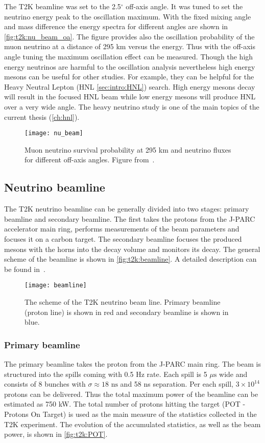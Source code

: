 \documentclass[../main.tex]{subfiles}
\begin{document}
The T2K beamline was set to the 2.5${}^\circ$ off-axis angle. It was tuned to set the neutrino energy peak to the oscillation maximum. With the fixed mixing angle and mass difference the energy spectra for different angles are shown in \autoref{fig:t2k:nu_beam_oa}. The figure provides also the oscillation probability of the muon neutrino at a distance of 295 km versus the energy. Thus with the off-axis angle tuning the maximum oscillation effect can be measured. Though the high energy neutrinos are harmful to the oscillation analysis nevertheless high energy mesons can be useful for other studies. For example, they can be helpful for the Heavy Neutral Lepton (HNL \autoref{sec:intro:HNL}) search. High energy mesons decay will result in the focused HNL beam while low energy mesons will produce HNL over a very wide angle. The heavy neutrino study is one of the main topics of the current thesis (\autoref{ch:hnl}).

\begin{figure}[!ht]
  \centering
  \texttt{[image: nu\_beam]}
  \caption{Muon neutrino survival probability at 295 km and neutrino fluxes for different off-axis angles. Figure from~\cite{Abe2013}.}
  \label{fig:t2k:nu_beam_oa}
\end{figure}

\subsection{Neutrino beamline}
The T2K neutrino beamline can be generally divided into two stages: primary beamline and secondary beamline. The first takes the protons from the J-PARC accelerator main ring, performs measurements of the beam parameters and focuses it on a carbon target. The secondary beamline focuses the produced mesons with the horns into the decay volume and monitors its decay. The general scheme of the beamline is shown in \autoref{fig:t2k:beamline}. A detailed description can be found in~\cite{Abe2013}.

\begin{figure}[!ht]
  \centering
  \texttt{[image: beamline]}
  \caption{The scheme of the T2K neutrino beam line. Primary beamline (proton line) is shown in red and secondary beamline is shown in blue.}
  \label{fig:t2k:beamline}
\end{figure}

\subsubsection{Primary beamline}
The primary beamline takes the proton from the J-PARC main ring. The beam is structured into the spills coming with 0.5 Hz rate. Each spill is 5 $\mu\text{s}$ wide and consists of 8 bunches with $\sigma\approx18 \text{ ns}$ and 58 ns separation. Per each spill, $3\times10^{14}$ protons can be delivered. Thus the total maximum power of the beamline can be estimated as 750 kW. The total number of protons hitting the target (POT - Protons On Target) is used as the main measure of the statistics collected in the T2K experiment. The evolution of the accumulated statistics, as well as the beam power, is shown in \autoref{fig:t2k:POT}.
\end{document}
